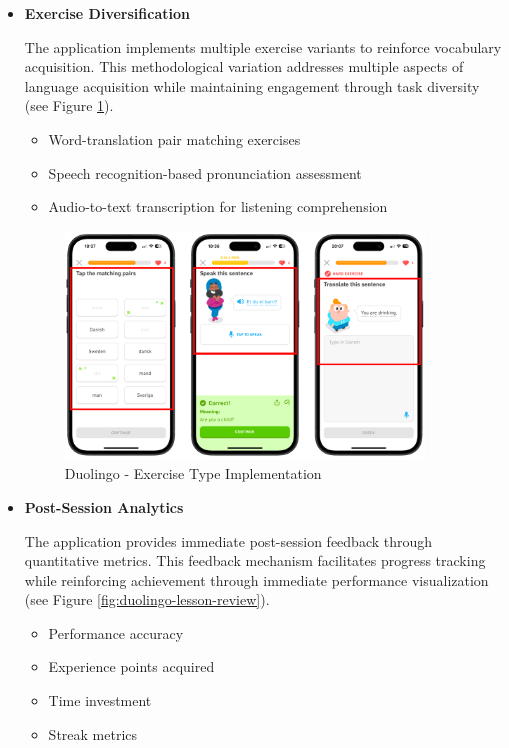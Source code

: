 \begin{itemize}
    \item \textbf{Exercise Diversification}

    The application implements multiple exercise variants to reinforce vocabulary acquisition. This methodological variation addresses multiple aspects of language acquisition while maintaining engagement through task diversity (see Figure \ref{fig:duolingo-exercise-types}).

    \begin{itemize}
        \item Word-translation pair matching exercises
        \item Speech recognition-based pronunciation assessment
        \item Audio-to-text transcription for listening comprehension
    \end{itemize}

    \begin{figure}[!h]
        \includegraphics[width=0.9\textwidth]{src/figures/duolingo-exercise-types.png}
        \caption{Duolingo - Exercise Type Implementation}
        \label{fig:duolingo-exercise-types}
    \end{figure}
    \newpage
    \item \textbf{Post-Session Analytics}
    \label{sec:duolingo-lesson-review}

    The application provides immediate post-session feedback through quantitative metrics. This feedback mechanism facilitates progress tracking while reinforcing achievement through immediate performance visualization (see Figure \ref{fig:duolingo-lesson-review}).
    
    \begin{itemize}
        \item Performance accuracy
        \item Experience points acquired
        \item Time investment
        \item Streak metrics
    \end{itemize}


\end{itemize}
